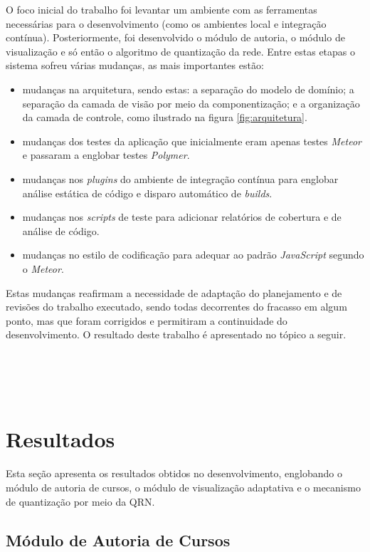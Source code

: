 O foco inicial do trabalho foi levantar um ambiente com as ferramentas necessárias para o desenvolvimento (como os ambientes local e integração contínua). Posteriormente, foi desenvolvido o módulo de autoria, o  módulo de visualização e só então o algoritmo de quantização da rede. Entre estas etapas o sistema sofreu várias mudanças, as mais importantes estão: 
\begin{itemize}
	\item mudanças na arquitetura, sendo estas: a separação do modelo de domínio; a separação da camada de visão por meio da componentização; e a organização da camada de controle, como ilustrado na figura \ref{fig:arquitetura}.
	\item mudanças dos testes da aplicação que inicialmente eram apenas testes \textit{Meteor} e passaram a englobar testes \textit{Polymer}.
	\item mudanças nos \textit{plugins} do ambiente de integração contínua para englobar análise estática de código e disparo automático de \textit{builds}.
	\item mudanças nos \textit{scripts} de teste para adicionar relatórios de cobertura e de análise de código.
	\item mudanças no estilo de codificação para adequar ao padrão \textit{JavaScript} segundo o \textit{Meteor}.
\end{itemize}

Estas mudanças reafirmam a necessidade de adaptação do planejamento e de revisões do trabalho executado, sendo todas decorrentes do fracasso em algum ponto, mas que foram corrigidos e permitiram a continuidade do desenvolvimento. O resultado deste trabalho é apresentado no tópico a seguir. 
\\
\\
\\
\\
\\

\section{Resultados}

Esta seção apresenta os resultados obtidos no desenvolvimento, englobando o módulo de autoria de cursos, o módulo de visualização adaptativa e o mecanismo de quantização por meio da QRN.

\subsection{Módulo de Autoria de Cursos}

